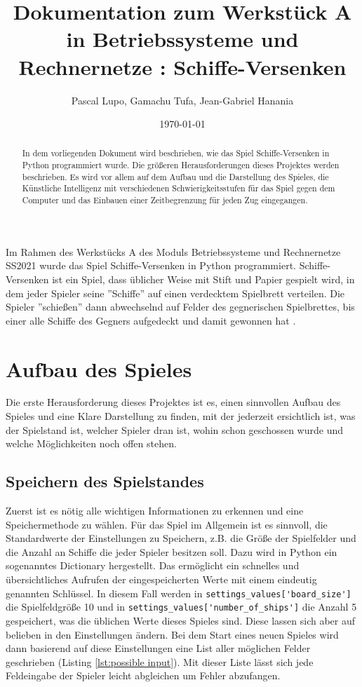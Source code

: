 \documentclass{article}
\title{Dokumentation zum Werkstück A in Betriebssysteme und Rechnernetze : Schiffe-Versenken}
\author{Pascal Lupo, Gamachu Tufa, Jean-Gabriel Hanania}
\date{\today}
\begin{document}
\maketitle
\thispagestyle{empty} %

\begin{abstract}
    In dem vorliegenden Dokument wird beschrieben, wie das Spiel Schiffe-Versenken in Python programmiert wurde. Die größeren Herausforderungen dieses Projektes werden beschrieben. Es wird vor allem auf dem Aufbau und die Darstellung des Spieles, die Künstliche Intelligenz mit verschiedenen Schwierigkeitsstufen für das Spiel gegen dem Computer und das Einbauen einer Zeitbegrenzung für jeden Zug eingegangen.
\end{abstract}

\section*{}
    Im Rahmen des Werkstücks A des Moduls Betriebssysteme und Rechnernetze SS2021 wurde das Spiel Schiffe-Versenken in Python programmiert. Schiffe-Versenken ist ein Spiel, dass üblicher Weise mit Stift und Papier gespielt wird, in dem jeder Spieler seine ''Schiffe'' auf einen verdecktem Spielbrett verteilen. Die Spieler ''schießen'' dann abwechselnd auf Felder des gegnerischen Spielbrettes, bis einer alle Schiffe des Gegners aufgedeckt und damit gewonnen hat .


\section{Aufbau des Spieles}
    Die erste Herausforderung dieses Projektes ist es, einen sinnvollen Aufbau des Spieles und eine Klare Darstellung zu finden, mit der jederzeit ersichtlich ist, was der Spielstand ist, welcher Spieler dran ist, wohin schon geschossen wurde und welche Möglichkeiten noch offen stehen.

\subsection{Speichern des Spielstandes}
    Zuerst ist es nötig alle wichtigen Informationen zu erkennen und eine Speichermethode zu wählen. Für das Spiel im Allgemein ist es sinnvoll, die Standardwerte der Einstellungen zu Speichern, z.B. die Größe der Spielfelder und die Anzahl an Schiffe die jeder Spieler besitzen soll. Dazu wird in Python ein sogenanntes Dictionary hergestellt. Das ermöglicht ein schnelles und übersichtliches Aufrufen der eingespeicherten Werte mit einem eindeutig genannten Schlüssel. In diesem Fall werden in \verb$settings_values['board_size']$ die Spielfeldgröße 10 und in \verb$settings_values['number_of_ships']$ die Anzahl 5 gespeichert, was die üblichen Werte dieses Spieles sind. Diese lassen sich aber auf belieben in den Einstellungen ändern. Bei dem Start eines neuen Spieles wird dann basierend auf diese Einstellungen eine List aller möglichen Felder geschrieben (Listing \ref{lst:possible input}). Mit dieser Liste lässt sich jede Feldeingabe der Spieler leicht abgleichen um Fehler abzufangen.
\end{document}
